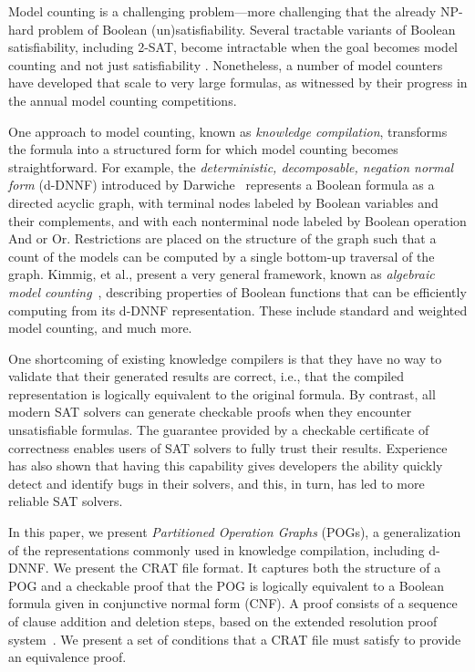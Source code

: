 \documentclass[letterpaper,USenglish,cleveref, autoref, thm-restate]{lipics-v2021}
\begin{document}
Model counting is a challenging problem---more challenging that the
already NP-hard problem of Boolean (un)satisfiability.  Several
tractable variants of Boolean satisfiability, including 2-SAT, become
intractable when the goal becomes model counting and not just
satisfiability \cite{valiant:siam:1979}.  Nonetheless, a number of
model counters have developed that scale to very large formulas, as
witnessed by their progress in the annual model counting competitions.

One approach to model counting, known as {\em knowledge compilation},
transforms the formula into a structured form for which model counting
becomes straightforward.  For example, the {\em deterministic,
  decomposable, negation normal form} (d-DNNF) introduced by
Darwiche~\cite{darwiche:aaai:2002,darwiche:ecai:2004} represents a
Boolean formula as a directed acyclic graph, with terminal nodes
labeled by Boolean variables and their complements, and with each
nonterminal node labeled by Boolean operation And or Or.  Restrictions
are placed on the structure of the graph such that a count of the
models can be computed by a single bottom-up traversal of the graph.
Kimmig, et al., present a very general framework, known as {\em
  algebraic model counting}~\cite{kimmig:jal:2017}, describing
properties of Boolean functions that can be efficiently computing from
its d-DNNF representation.  These include standard and weighted model
counting, and much more.

One shortcoming of existing knowledge compilers is that they have no
way to validate that their generated results are correct, i.e., that
the compiled representation is logically equivalent to the original
formula.  By contrast, all modern SAT solvers can generate
checkable proofs when they encounter unsatisfiable formulas.  The
guarantee provided by a checkable certificate of correctness enables
users of SAT solvers to fully trust their results.  Experience has also
shown that having this capability gives developers the ability quickly
detect and identify bugs in their solvers, and this, in turn, has led
to more reliable SAT solvers.

In this paper, we present \emph{Partitioned Operation Graphs} (POGs),
a generalization of the representations commonly used in knowledge
compilation, including d-DNNF\@.  We present the CRAT file format.
It captures both the structure of a POG and a checkable proof
that the POG is logically equivalent to a Boolean formula given in
conjunctive normal form (CNF).  A proof consists of a sequence of
clause addition and deletion steps, based on the extended resolution
proof system~\cite{Tseitin:1983}.  We present a set of conditions that
a CRAT file must satisfy to provide an equivalence proof.
\end{document}
